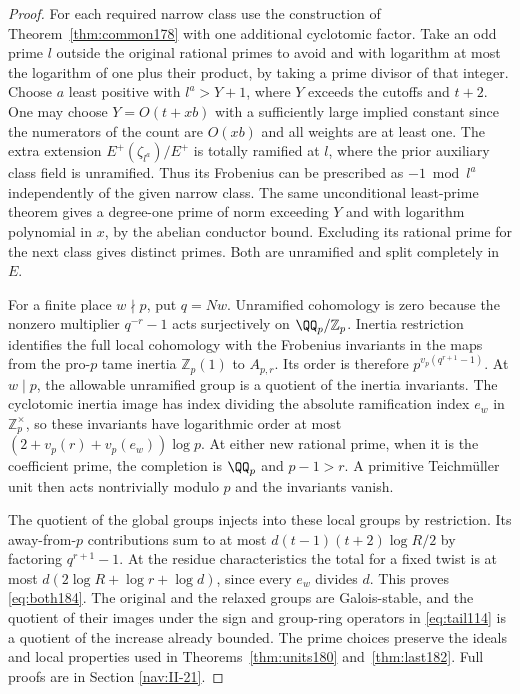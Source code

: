 \documentclass[a4paper,11pt]{article}
\theoremstyle{definition}
\theoremstyle{remark}
\newcommand{\ZZ}{\mathbb Z}\newcommand{\ord}{\operatorname{ord}}
\numberwithin{equation}{section}
\begin{document}
\begin{proof}
For each required narrow class use the construction of
Theorem~\ref{thm:common178} with one additional cyclotomic
factor. Take an odd prime \(l\) outside the original rational
primes to avoid and with logarithm at most the logarithm of
one plus their product, by taking a prime divisor of that
integer. Choose \(a\) least positive with \(l^a>Y+1\),
where \(Y\) exceeds the cutoffs and \(t+2\). One may
choose \(Y=O(t+xb)\) with a sufficiently large implied
constant since the numerators of the count are \(O(xb)\)
and all weights are at least one. The extra extension
\(E^+(\zeta_{l^a})/E^+\) is totally ramified at \(l\),
where the prior auxiliary class field is unramified. Thus
its Frobenius can be prescribed as \(-1\bmod l^a\)
independently of the given narrow class. The same
unconditional least-prime theorem gives a degree-one prime
of norm exceeding \(Y\) and with logarithm polynomial in
\(x\), by the abelian conductor bound. Excluding its rational
prime for the next class gives distinct primes. Both are
unramified and split completely in \(E\).

For a finite place \(w\nmid p\), put \(q=Nw\). Unramified
cohomology is zero because the nonzero multiplier
\(q^{-r}-1\) acts surjectively on \(\QQ_p/\ZZ_p\). Inertia
restriction identifies the full local cohomology with the
Frobenius invariants in the maps from the pro-\(p\) tame
inertia \(\ZZ_p(1)\) to \(A_{p,r}\). Its order is therefore
\(p^{v_p(q^{r+1}-1)}\). At \(w\mid p\), the allowable
unramified group is a quotient of the inertia invariants.
The cyclotomic inertia image has index dividing the absolute
ramification index \(e_w\) in \(\ZZ_p^\times\), so these
invariants have logarithmic order at most
\((2+v_p(r)+v_p(e_w))\log p\). At either new rational
prime, when it is the coefficient prime, the completion is
\(\QQ_p\) and \(p-1>r\). A primitive Teichm\"uller unit
then acts nontrivially modulo \(p\) and the invariants vanish.

The quotient of the global groups injects into these
local groups by restriction. Its away-from-\(p\) contributions
sum to at most \(d(t-1)(t+2)\log R/2\) by factoring
\(q^{r+1}-1\). At the residue characteristics the total
for a fixed twist is at most \(d(2\log R+\log r+\log d)\),
since every \(e_w\) divides \(d\). This proves \eqref{eq:both184}.
The original and the relaxed groups are Galois-stable,
and the quotient of their images under the sign and
group-ring operators in \eqref{eq:tail114} is a quotient
of the increase already bounded. The prime choices preserve
the ideals and local properties used in
Theorems~\ref{thm:units180} and~\ref{thm:last182}. Full
proofs are in Section \ref{nav:II-21}.
\end{proof}
\end{document}
